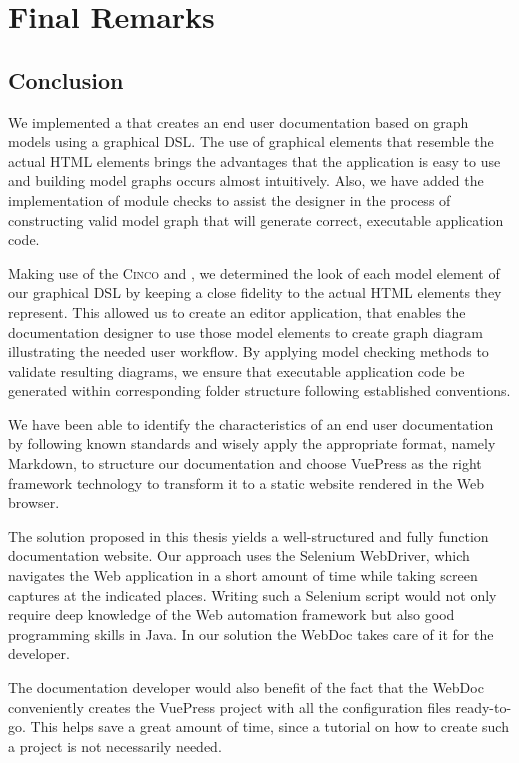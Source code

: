 \chapter{Final Remarks}\label{ch:epilogue}

\section{Conclusion}\label{sec:concl}

We implemented a  that creates an end user documentation based on graph models using a graphical DSL. The use of graphical elements that resemble the actual HTML elements brings the advantages that the application is easy to use and building model graphs occurs almost intuitively. Also, we have added the implementation of module checks to assist the designer in the process of constructing valid model graph that will generate correct, executable application code.

Making use of the \textsc{Cinco}  and , we determined the look of each model element of our graphical DSL by keeping a close fidelity to the actual HTML elements they represent. This allowed us to create an editor application, that enables the documentation designer to use those model elements to create graph diagram illustrating the needed user workflow. By applying model checking methods to validate resulting diagrams, we ensure that executable application code be generated within corresponding folder structure following established conventions.

We have been able to identify the characteristics of an end user documentation by following known standards and wisely apply the appropriate format, namely Markdown, to structure our documentation and choose VuePress as the right framework technology to transform it to a static website rendered in the Web browser.

The solution proposed in this thesis yields a well-structured and fully function documentation website. Our approach uses the Selenium WebDriver, which navigates the Web application in a short amount of time while taking screen captures at the indicated places. Writing such a Selenium script would not only require deep knowledge of the Web automation framework but also good programming skills in Java. In our solution the WebDoc takes care of it for the developer.

The documentation developer would also benefit of the fact that the WebDoc conveniently creates the VuePress project with all the configuration files ready-to-go. This helps save a great amount of time, since a tutorial on how to create such a project is not necessarily needed.

